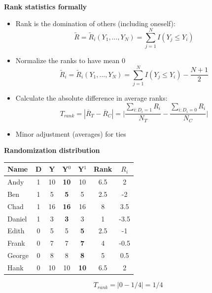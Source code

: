 \documentclass[notes=show]{beamer}
\begin{document}
\begin{frame}[plain]
\begin{center}
\textbf{Rank statistics formally}
\end{center}

\begin{itemize}
\item Rank is the domination of others (including oneself): $$\tilde{R} = \tilde{R}_i(Y_1, \dots , Y_N) = \sum_{j=1}^N I(Y_j \leq Y_i)$$
\item Normalize the ranks to have mean 0 $$\tilde{R}_i = \tilde{R}_i(Y_1, \dots, Y_N) = \sum_{j=1}^N I(Y_j \leq Y_i) - \frac{N+1}{2}$$
\item Calculate the absolute difference in average ranks: $$T_{rank} = |\overline{R}_T - \overline{R}_C | = \bigg | \frac{\sum_{i:D_i=1} R_i}{N_T} - \frac{\sum_{i:D_i=0} R_i}{N_C} \bigg |$$
\item Minor adjustment (averages) for ties
\end{itemize}

\end{frame}

\begin{frame}[plain]
\begin{center}
\textbf{Randomization distribution}
\end{center}

\begin{table}[htbp]\centering
\begin{center}
\begin{threeparttable}
\begin{tabular}{l|cc|cc|cc}
\toprule
\multicolumn{1}{l}{Name}&
\multicolumn{1}{c}{D}&
\multicolumn{1}{c}{Y}&
\multicolumn{1}{c}{Y$^0$}&
\multicolumn{1}{c}{Y$^1$}&
\multicolumn{1}{c}{Rank}&
\multicolumn{1}{c}{$R_i$}\\
\midrule
Andy		& 1 & 10  & \textbf{10} & 10 & 6.5 & 2\\
Ben		& 1 & 5    & \textbf{5} & 5 & 2.5 & -2\\
Chad	& 1 & 16  & \textbf{16} & 16 & 8  &3.5 \\
Daniel	& 1 &  3   & \textbf{3} & 3 & 1 & -3.5\\
Edith		& 0 & 5    & 5 & \textbf{5} & 2.5 & -1\\
Frank	& 0 & 7    & 7& \textbf{7} & 4 & -0.5 \\
George	& 0 & 8    & 8 & \textbf{8} & 5 & 0.5\\
Hank		& 0 & 10  & 10 & \textbf{10} & 6.5 & 2\\
\bottomrule
\end{tabular}
\end{threeparttable}
\end{center}
\end{table}


$$T_{rank} = | 0 - 1/4 | = 1/4$$

\end{frame}
\end{document}

